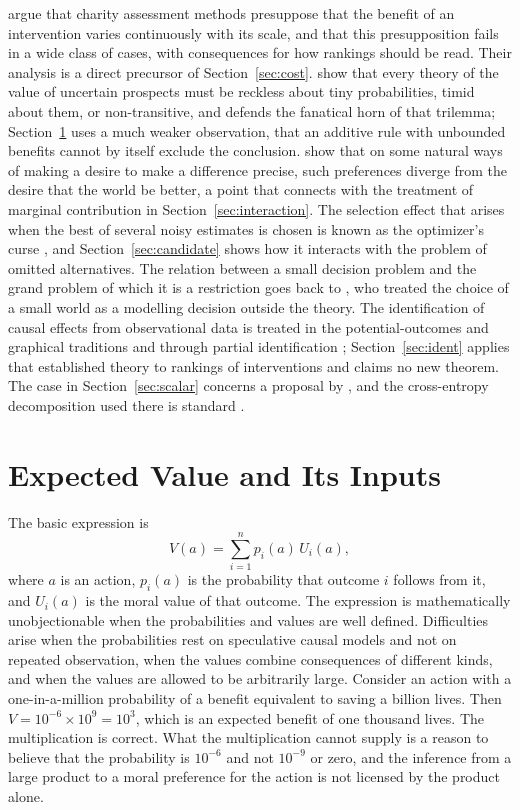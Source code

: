 \documentclass[11pt]{article}
\theoremstyle{definition}
\theoremstyle{remark}
\begin{document}
\citet{cote2023} argue that charity assessment methods presuppose that the benefit of an intervention varies continuously with its scale, and that this presupposition fails in a wide class of cases, with consequences for how rankings should be read. Their analysis is a direct precursor of Section~\ref{sec:cost}. \citet{beckstead2024} show that every theory of the value of uncertain prospects must be reckless about tiny probabilities, timid about them, or non-transitive, and \citet{wilkinson2022} defends the fanatical horn of that trilemma; Section~\ref{sec:ev} uses a much weaker observation, that an additive rule with unbounded benefits cannot by itself exclude the conclusion. \citet{greaves2024} show that on some natural ways of making a desire to make a difference precise, such preferences diverge from the desire that the world be better, a point that connects with the treatment of marginal contribution in Section~\ref{sec:interaction}. The selection effect that arises when the best of several noisy estimates is chosen is known as the optimizer's curse \citep{smith2006}, and Section~\ref{sec:candidate} shows how it interacts with the problem of omitted alternatives. The relation between a small decision problem and the grand problem of which it is a restriction goes back to \citet{savage1954}, who treated the choice of a small world as a modelling decision outside the theory. The identification of causal effects from observational data is treated in the potential-outcomes and graphical traditions \citep{pearl2009} and through partial identification \citep{manski1990}; Section~\ref{sec:ident} applies that established theory to rankings of interventions and claims no new theorem. The case in Section~\ref{sec:scalar} concerns a proposal by \citet{pachocki2026}, and the cross-entropy decomposition used there is standard \citep{cover2006}.

\section{Expected Value and Its Inputs}
\label{sec:ev}

The basic expression is
\begin{equation}
V(a)=\sum_{i=1}^{n}p_i(a)\,U_i(a),
\label{eq:ev}
\end{equation}
where $a$ is an action, $p_i(a)$ is the probability that outcome $i$ follows from it, and $U_i(a)$ is the moral value of that outcome. The expression is mathematically unobjectionable when the probabilities and values are well defined. Difficulties arise when the probabilities rest on speculative causal models and not on repeated observation, when the values combine consequences of different kinds, and when the values are allowed to be arbitrarily large. Consider an action with a one-in-a-million probability of a benefit equivalent to saving a billion lives. Then $V=10^{-6}\times10^{9}=10^{3}$, which is an expected benefit of one thousand lives. The multiplication is correct. What the multiplication cannot supply is a reason to believe that the probability is $10^{-6}$ and not $10^{-9}$ or zero, and the inference from a large product to a moral preference for the action is not licensed by the product alone.
\end{document}
